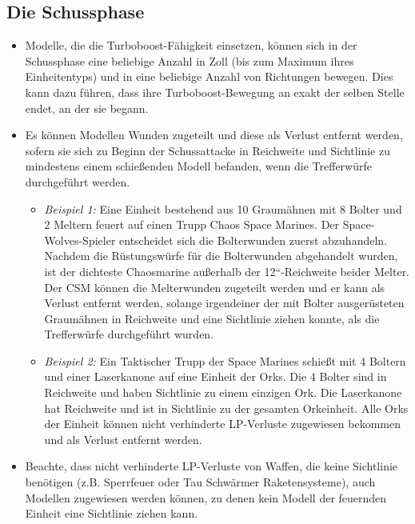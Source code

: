 \subsection{Die Schussphase}

\begin{itemize}

 \item Modelle, die die Turboboost-Fähigkeit einsetzen, können sich in der
  Schussphase eine beliebige Anzahl in Zoll (bis zum Maximum ihres
  Einheitentyps) und in eine beliebige Anzahl von Richtungen bewegen. Dies kann
  dazu führen, dass ihre Turboboost-Bewegung an exakt der selben Stelle endet,
  an der sie begann.

 \item Es können Modellen Wunden zugeteilt und diese als Verlust entfernt
  werden, sofern sie sich zu Beginn der Schussattacke in Reichweite und
  Sichtlinie zu mindestens einem schießenden Modell befanden, wenn die
  Trefferwürfe durchgeführt werden.
\begin{itemize}

 \item \textit{Beispiel 1:} Eine Einheit bestehend aus 10 Graumähnen mit 8 Bolter und 2
  Meltern feuert auf einen Trupp Chaos Space Marines. Der Space-Wolves-Spieler
  entscheidet sich die Bolterwunden zuerst abzuhandeln. Nachdem die
  Rüstungswürfe für die Bolterwunden abgehandelt wurden, ist der dichteste
  Chaosmarine außerhalb der 12“-Reichweite beider Melter. Der CSM können die
  Melterwunden zugeteilt werden und er kann als Verlust entfernt werden,
  solange irgendeiner der mit Bolter ausgerüsteten Graumähnen in Reichweite und
  eine Sichtlinie ziehen konnte, als die Trefferwürfe durchgeführt wurden.

 \item \textit{Beispiel 2:} Ein Taktischer Trupp der Space Marines schießt mit 4 Boltern
  und einer Laserkanone auf eine Einheit der Orks. Die 4 Bolter sind in
  Reichweite und haben Sichtlinie zu einem einzigen Ork. Die Laserkanone hat
  Reichweite und ist in Sichtlinie zu der gesamten Orkeinheit. Alle Orks der
  Einheit können nicht verhinderte LP-Verluste zugewiesen bekommen und als
  Verlust entfernt werden.

\end{itemize}

\item Beachte, dass nicht verhinderte LP-Verluste von Waffen, die keine
 Sichtlinie benötigen (z.B. Sperrfeuer oder Tau Schwärmer Raketensysteme), auch
 Modellen zugewiesen werden können, zu denen kein Modell der feuernden Einheit
 eine Sichtlinie ziehen kann.


\end{itemize}
